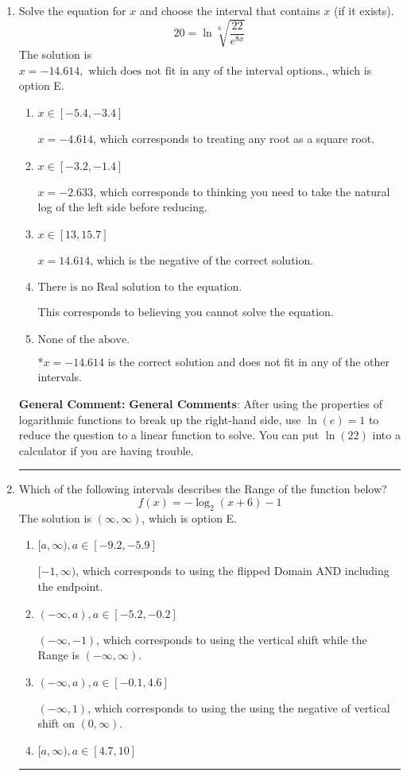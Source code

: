 \documentclass{extbook}[14pt]
\newcommand{\litem}[1]{\item #1

\rule{\textwidth}{0.4pt}}
\begin{document}
\begin{enumerate}\litem{
 Solve the equation for $x$ and choose the interval that contains $x$ (if it exists).
\[  20 = \ln{\sqrt[6]{\frac{22}{e^{8x}}}} \]The solution is \( x = -14.614, \text{ which does not fit in any of the interval options.} \), which is option E.\begin{enumerate}[label=\Alph*.]
\item \( x \in [-5.4, -3.4] \)

$x = -4.614$, which corresponds to treating any root as a square root.
\item \( x \in [-3.2, -1.4] \)

$x = -2.633$, which corresponds to thinking you need to take the natural log of the left side before reducing.
\item \( x \in [13, 15.7] \)

$x = 14.614$, which is the negative of the correct solution.
\item \( \text{There is no Real solution to the equation.} \)

This corresponds to believing you cannot solve the equation.
\item \( \text{None of the above.} \)

*$x = -14.614$ is the correct solution and does not fit in any of the other intervals.
\end{enumerate}

\textbf{General Comment:} \textbf{General Comments}: After using the properties of logarithmic functions to break up the right-hand side, use $\ln(e) = 1$ to reduce the question to a linear function to solve. You can put $\ln(22)$ into a calculator if you are having trouble.
}
\litem{
Which of the following intervals describes the Range of the function below?
\[ f(x) = -\log_2{(x+6)}-1 \]The solution is \( (\infty, \infty) \), which is option E.\begin{enumerate}[label=\Alph*.]
\item \( [a, \infty), a \in [-9.2, -5.9] \)

$[-1, \infty)$, which corresponds to using the flipped Domain AND including the endpoint.
\item \( (-\infty, a), a \in [-5.2, -0.2] \)

$(-\infty, -1)$, which corresponds to using the vertical shift while the Range is $(-\infty, \infty)$.
\item \( (-\infty, a), a \in [-0.1, 4.6] \)

$(-\infty, 1)$, which corresponds to using the using the negative of vertical shift on $(0, \infty)$.
\item \( [a, \infty), a \in [4.7, 10] \)


\end{enumerate}}
\end{enumerate}
\end{document}
